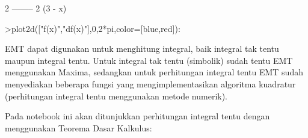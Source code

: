 \documentclass{article}
\begin{document}
\begin{eulernotebook}
\begin{eulercomment}
\begin{eulercomment}
\begin{eulercomment}
\begin{eulercomment}
\begin{euleroutput}
                                    2
                                 --------
                                        2
                                 (3 - x)
  
\end{euleroutput}
\begin{eulerprompt}
>plot2d(["f(x)","df(x)"],0,2*pi,color=[blue,red]):
\end{eulerprompt}
\begin{eulercomment}
EMT dapat digunakan untuk menghitung integral, baik integral tak tentu maupun
integral tentu. Untuk integral tak tentu (simbolik) sudah tentu EMT menggunakan
Maxima, sedangkan untuk perhitungan integral tentu EMT sudah menyediakan beberapa
fungsi yang mengimplementasikan algoritma kuadratur (perhitungan integral tentu
menggunakan metode numerik).

Pada notebook ini akan ditunjukkan perhitungan integral tentu dengan menggunakan
Teorema Dasar Kalkulus:


\end{eulercomment}
\end{eulercomment}
\end{eulercomment}
\end{eulercomment}
\end{eulercomment}
\end{eulernotebook}
\end{document}
